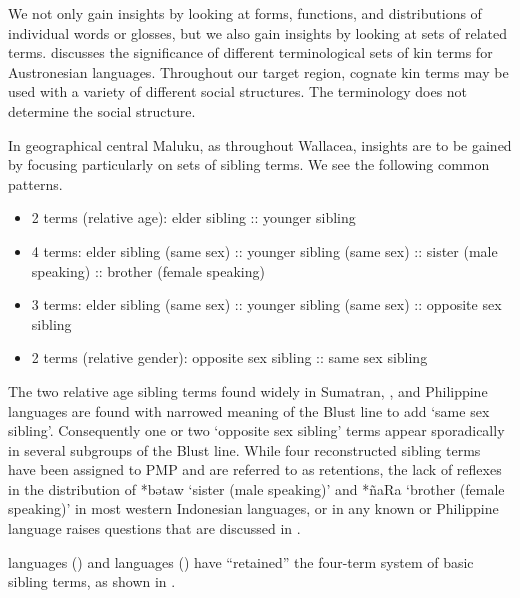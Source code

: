 We not only gain insights by looking at forms,
functions, and distributions of individual words or glosses,
but we also gain insights by looking at sets of related terms.
\citet{Fox2015} discusses the significance of different terminological
sets of kin terms for Austronesian languages.
Throughout our target region,
cognate kin terms may be used with a variety of different social structures.
The terminology does not determine the social structure.

In geographical central Maluku,
as throughout Wallacea, insights are to be gained by focusing
particularly on sets of sibling terms.
We see the following common patterns.

\begin{itemize}
	\item 2 terms (relative age): elder sibling :: younger sibling
	\item 4 terms: elder sibling (same sex) :: younger sibling (same sex) :: sister (male speaking) :: brother (female speaking)
	\item 3 terms: elder sibling (same sex) :: younger sibling (same sex) :: opposite sex sibling
	\item 2 terms (relative gender): opposite sex sibling :: same sex sibling
\end{itemize}

The two relative age sibling terms found widely in Sumatran,
, and Philippine languages are found with narrowed
meaning  of the Blust line to add ‘same sex sibling’.
Consequently one or two ‘opposite sex sibling’ terms appear sporadically
in several subgroups  of the Blust line.
While four reconstructed sibling terms have been assigned to
PMP and are referred to as retentions,
the lack of reflexes in the distribution of *bətaw ‘sister (male
speaking)’ and *ñaRa ‘brother (female speaking)’ in most western Indonesian
languages, or in any known  or Philippine language raises questions
that are discussed in .

 languages () and  languages
() have “retained” the four-term system of basic sibling
terms, as shown in .


